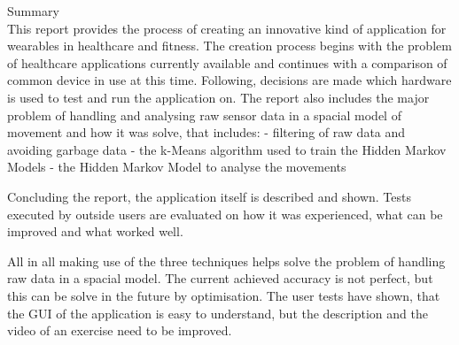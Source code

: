 \hfill{\Huge Summary}\\

This report provides the process of creating an innovative kind of application for wearables in healthcare and fitness.
The creation process begins with the problem of healthcare applications currently available and continues with a comparison of common device in use at this time. Following, decisions are made which hardware is used to test and run the application on. \newline
The report also includes the major problem of handling and analysing raw sensor data in a spacial model of movement and how it was solve, that includes: \newline
- filtering of raw data and avoiding garbage data \newline
- the k-Means algorithm used to train the Hidden Markov Models \newline
- the Hidden Markov Model to analyse the movements
\newline

Concluding the report, the application itself is described and shown. Tests executed by outside users are evaluated on how it was experienced, what can be improved and what worked well.
\newline

All in all making use of the three techniques helps solve the problem of handling raw data in a spacial model. The current achieved accuracy is not perfect, but this can be solve in the future by optimisation.
The user tests have shown, that the GUI of the application is easy to understand, but the description and the video of an exercise need to be improved.